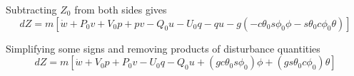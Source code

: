 \documentclass[a4paper]{article}
\begin{document}
\noindent Subtracting $Z_0$ from both sides gives
\begin{equation*}
dZ = m[\dot{w} + P_0 v + V_0 p + p v - Q_0 u - U_0 q - q u - g (- c\theta_0  s\phi_0 \phi - s\theta_0 c\phi_0 \theta)]
\end{equation*}

\noindent Simplifying some signs and removing products of disturbance quantities
\begin{equation*}
dZ = m[\dot{w} + V_0 p + P_0 v - U_0 q - Q_0 u + (g c\theta_0  s\phi_0) \phi + (g s\theta_0 c\phi_0) \theta]
\end{equation*}
\end{document}
